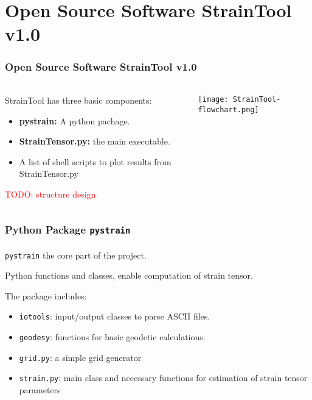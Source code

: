 \section{Open Source Software \textbf{StrainTool v1.0}}
 
\graphicspath{{Chapter2/Figs/}}

\begin{frame}
  \frametitle{Open Source Software \textbf{StrainTool v1.0}}
  \framesubtitle{}
  \label{ch2:straintool}
  
  \begin{columns}
    \begin{column}{0.5\textwidth}
      StrainTool has three basic components:
      \begin{itemize}
        \item \textbf{pystrain:} A python pachage.
        \item \textbf{StrainTensor.py:} the main executable.
        \item A list of shell scripts to plot results from StrainTensor.py
      \end{itemize}
      \textcolor{red}{TODO: structure design}
    \end{column}
    \begin{column}{0.5\textwidth}
      \texttt{[image: StrainTool-flowchart.png]} 
    \end{column}
  \end{columns}
\end{frame}
\note{}


\begin{frame}
  \frametitle{Python Package \texttt{pystrain}}
  \framesubtitle{}
  \label{ch2:}
  
  \texttt{pystrain} the core part of the project.
  
  Python functions and classes, enable computation of strain tensor.
  
  The package includes:
  \begin{itemize}
    \item \texttt{iotools}: input/output classes to parse ASCII files.
    \item \texttt{geodesy}: functions for basic geodetic calculations.
    \item \texttt{grid.py}: a simple grid generator
    \item \texttt{strain.py}: main class and necessary functions for estimation of strain  tensor parameters
  \end{itemize}
  
  

\end{frame}
\note{}



